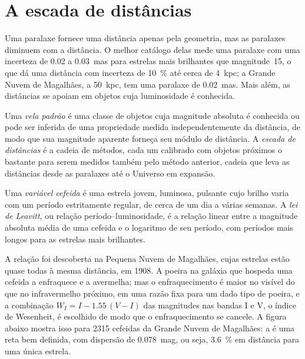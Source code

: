 \section{A escada de distâncias}\label{sec:b3:milky-way-galaxies:ladder}

Uma paralaxe fornece uma distância apenas pela geometria, mas as paralaxes diminuem com
a distância. O melhor catálogo delas mede uma paralaxe com uma
incerteza de 0.02 a \qty{0.03}{mas} para estrelas mais brilhantes que
magnitude~15, o que dá uma distância com incerteza de \qty{10}{\percent} até cerca de
\qty{4}{kpc}; a Grande Nuvem de Magalhães, a \qty{50}{kpc}, tem uma
paralaxe de \qty{0.02}{mas}. Mais além, as distâncias se apoiam em objetos cuja
luminosidade é conhecida.

\begin{definition}\label{def:b3:milky-way-galaxies:ladder}
Uma \emph{vela padrão} é uma classe de objetos
cuja magnitude absoluta é conhecida ou pode ser inferida de uma propriedade
medida independentemente da distância, de modo que sua magnitude aparente forneça
seu módulo de distância. A \emph{escada de distâncias} é
a cadeia de métodos, cada um calibrado com objetos próximos o bastante para serem
medidos também pelo método anterior, cadeia que leva as distâncias desde
as paralaxes até o Universo em expansão.
\end{definition}

\begin{definition}\label{def:b3:milky-way-galaxies:cepheid}
Uma \emph{variável cefeida} é uma estrela jovem, luminosa,
pulsante cujo brilho varia com um período estritamente regular,
de cerca de um dia a várias semanas. A \emph{lei de Leavitt},
ou relação período--luminosidade, é a relação linear entre a magnitude absoluta média
de uma cefeida e o logaritmo de seu período, com períodos mais longos
para as estrelas mais brilhantes.
\end{definition}

A relação foi descoberta na Pequena Nuvem de Magalhães, cujas estrelas
estão quase todas à mesma distância, em 1908. A poeira na galáxia que
hospeda uma cefeida a enfraquece e a avermelha; mas o enfraquecimento é maior no
visível do que no infravermelho próximo, em uma razão fixa para um dado tipo de
poeira, e a combinação $W_I = I - 1.55\,(V - I)$ das magnitudes nas
bandas I e V, o índice de Wesenheit, é escolhido de modo que o enfraquecimento
se cancele. A figura abaixo mostra isso para 2315 cefeidas da Grande
Nuvem de Magalhães: a  é uma reta bem definida, com dispersão de
\qty{0.078}{mag}, ou seja, \qty{3.6}{\percent} em distância para uma única
estrela.

